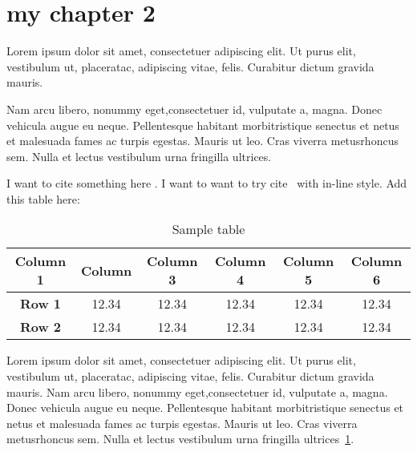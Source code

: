 \section{my chapter 2}

Lorem ipsum dolor sit amet, consectetuer adipiscing elit.  Ut purus elit, vestibulum ut, placeratac,  adipiscing vitae,  felis.   Curabitur dictum gravida mauris.  

Nam arcu libero,  nonummy eget,consectetuer id, vulputate a, magna. Donec vehicula augue eu neque. Pellentesque habitant morbitristique senectus et netus et malesuada fames ac turpis egestas. Mauris ut leo. Cras viverra metusrhoncus sem.  Nulla et lectus vestibulum urna fringilla ultrices. 

I want to cite something here \parencite{fennell2018predicting}. I want to want to try cite~\textcite{zuo2019standing} with in-line style.
Add this table here:

\begin{table}[ht]
    \centering
    \captionsetup{width=0.8\linewidth} %
    \caption{Sample table}
    \begin{tabular}{cccccc}
         \hline
         \textbf{Column 1} & \textbf{Column}  & \textbf{Column 3} & \textbf{Column 4} & \textbf{Column 5} & \textbf{Column 6}\\
         \hline
         \textbf{Row 1} & 12.34 & 12.34 & 12.34 & 12.34 & 12.34 \\
         \hline
         \textbf{Row 2} & 12.34 & 12.34 & 12.34 & 12.34 & 12.34 \\
         \hline
    \end{tabular}
    \label{table:table1}
\end{table}

Lorem ipsum dolor sit amet, consectetuer adipiscing elit.  Ut purus elit, vestibulum ut, placeratac,  adipiscing vitae,  felis.   Curabitur dictum gravida mauris.  
Nam arcu libero,  nonummy eget,consectetuer id, vulputate a, magna. Donec vehicula augue eu neque. Pellentesque habitant morbitristique senectus et netus et malesuada fames ac turpis egestas. Mauris ut leo. Cras viverra metusrhoncus sem.  Nulla et lectus vestibulum urna fringilla ultrices~\cref{table:table1}. 

